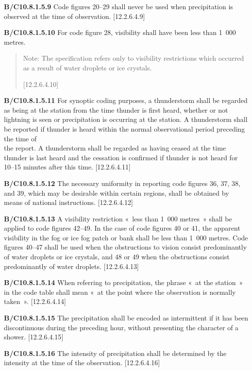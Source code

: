 \textbf{B/C10.8.1.5.9} Code figures 20--29 shall never be used when precipitation is observed at the time of observation. {[}12.2.6.4.9{]}

\textbf{B/C10.8.1.5.10} For code figure 28, visibility shall have been less than 1~000 metres.

\begin{quote}
Note: The specification refers only to visibility restrictions which occurred as a result of water droplets or ice crystals.

{[}12.2.6.4.10{]}
\end{quote}

\textbf{B/C10.8.1.5.11} For synoptic coding purposes, a thunderstorm shall be regarded as being at the station from the time thunder is first heard, whether or not lightning is seen or precipitation is occurring at the station. A thunderstorm shall be reported if thunder is heard within the normal observational period preceding the time of\\
the report. A thunderstorm shall be regarded as having ceased at the time thunder is last heard and the cessation is confirmed if thunder is not heard for 10--15 minutes after this time. {[}12.2.6.4.11{]}

\textbf{B/C10.8.1.5.12} The necessary uniformity in reporting code figures 36, 37, 38, and 39, which may be desirable within certain regions, shall be obtained by means of national instructions. {[}12.2.6.4.12{]}

\textbf{B/C10.8.1.5.13} A visibility restriction «~less than 1~000 metres~» shall be applied to code figures 42--49. In the case of code figures 40 or 41, the apparent visibility in the fog or ice fog patch or bank shall be less than 1~000 metres. Code figures 40--47 shall be used when the obstructions to vision consist predominantly of water droplets or ice crystals, and 48 or 49 when the obstructions consist predominantly of water droplets. {[}12.2.6.4.13{]}

\textbf{B/C10.8.1.5.14} When referring to precipitation, the phrase «~at the station~» in the code table shall mean «~at the point where the observation is normally taken~». {[}12.2.6.4.14{]}

\textbf{B/C10.8.1.5.15} The precipitation shall be encoded as intermittent if it has been discontinuous during the preceding hour, without presenting the character of a shower. {[}12.2.6.4.15{]}

\textbf{B/C10.8.1.5.16} The intensity of precipitation shall be determined by the intensity at the time of the observation. {[}12.2.6.4.16{]}

